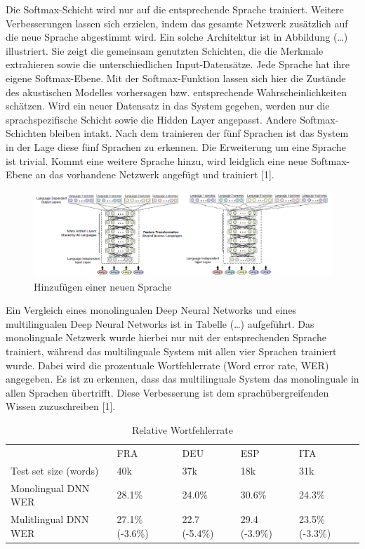 Die Softmax-Schicht wird nur auf die entsprechende Sprache trainiert. Weitere Verbesserungen lassen sich erzielen, indem das gesamte Netzwerk zusätzlich auf die neue Sprache abgestimmt wird. Ein solche Architektur ist in Abbildung (…) illustriert. Sie zeigt die gemeinsam genutzten Schichten, die die Merkmale extrahieren sowie die unterschiedlichen Input-Datensätze. Jede Sprache hat ihre eigene Softmax-Ebene. Mit der Softmax-Funktion lassen sich hier die Zustände des akustischen Modelles vorhersagen bzw. entsprechende Wahrscheinlichkeiten schätzen. Wird ein neuer Datensatz in das System gegeben, werden nur die sprachspezifische Schicht sowie die Hidden Layer angepasst. Andere Softmax-Schichten bleiben intakt. Nach dem trainieren der fünf Sprachen ist das System in der Lage diese fünf Sprachen zu erkennen. Die Erweiterung um eine Sprache ist trivial. Kommt eine weitere Sprache hinzu, wird leidglich eine neue Softmax-Ebene an das vorhandene Netzwerk angefügt und trainiert [1]. 

\begin{figure}[h!]
	\centering
	\includegraphics[width=1.0\linewidth]{images/shared_hidden_layer}
	\caption{Hinzufügen einer neuen Sprache  \cite{GonzalezDominguez.2015}} %
	\label{fig:topology}
\end{figure}

Ein Vergleich eines monolingualen Deep Neural Networks und eines multilingualen Deep Neural Networks ist in Tabelle (…) aufgeführt. Das monolinguale Netzwerk wurde hierbei nur mit der entsprechenden Sprache trainiert, während das multilinguale System mit allen vier Sprachen trainiert wurde. Dabei wird die prozentuale Wortfehlerrate (Word error rate, WER) angegeben. Es ist zu erkennen, dass das multilinguale System das monolinguale in allen Sprachen übertrifft. Diese Verbesserung ist dem sprachübergreifenden Wissen zuzuschreiben [1]. 

\begin{table}[h!]
	\begin{tabular}{lllll}
		& FRA             & DEU           & ESP           & ITA             \\
		Test set size (words) & 40k             & 37k           & 18k           & 31k             \\
		Monolingual DNN WER   & 28.1\%          & 24.0\%        & 30.6\%        & 24.3\%          \\
		Mulitlingual DNN WER  & 27.1\% (-3.6\%) & 22.7 (-5.4\%) & 29.4 (-3.9\%) & 23.5\% (-3.3\%)
	\end{tabular}
	\centering
	\caption{Relative Wortfehlerrate}
	\label{my-label}
\end{table}

